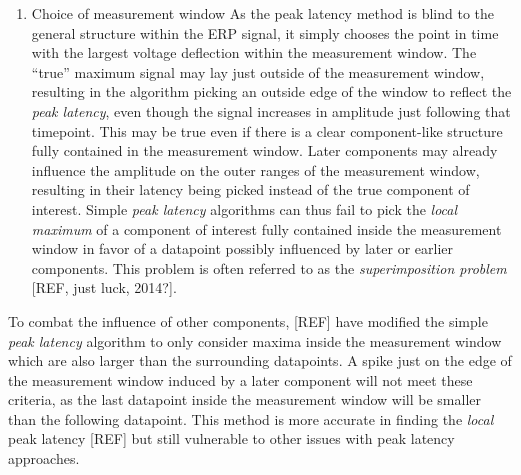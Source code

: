 \documentclass[
  man,floatsintext]{apa7}
\providecommand{\tightlist}{%
  \setlength{\itemsep}{0pt}\setlength{\parskip}{0pt}}
\begin{document}
\begin{enumerate}
\def\labelenumi{\arabic{enumi}.}
\tightlist
\item
  Choice of measurement window
  As the peak latency method is blind to the general structure within the ERP signal, it simply chooses the point in time with the largest voltage deflection within the measurement window. The ``true'' maximum signal may lay just outside of the measurement window, resulting in the algorithm picking an outside edge of the window to reflect the \emph{peak latency}, even though the signal increases in amplitude just following that timepoint. This may be true even if there is a clear component-like structure fully contained in the measurement window. Later components may already influence the amplitude on the outer ranges of the measurement window, resulting in their latency being picked instead of the true component of interest. Simple \emph{peak latency} algorithms can thus fail to pick the \emph{local maximum} of a component of interest fully contained inside the measurement window in favor of a datapoint possibly influenced by later or earlier components. This problem is often referred to as the \emph{superimposition problem} {[}REF, just luck, 2014?{]}.
\end{enumerate}

To combat the influence of other components, {[}REF{]} have modified the simple \emph{peak latency} algorithm to only consider maxima inside the measurement window which are also larger than the surrounding datapoints. A spike just on the edge of the measurement window induced by a later component will not meet these criteria, as the last datapoint inside the measurement window will be smaller than the following datapoint. This method is more accurate in finding the \emph{local} peak latency {[}REF{]} but still vulnerable to other issues with peak latency approaches.
\end{document}
